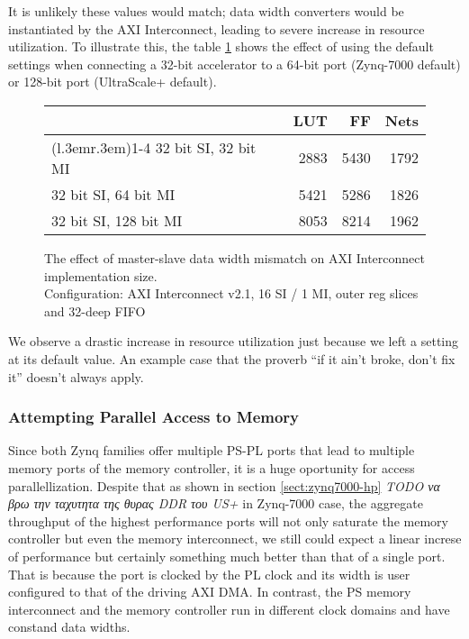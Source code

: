 It is unlikely these values would match; data width converters would be instantiated by
the AXI Interconnect, leading to severe increase in resource utilization.
To illustrate this, the table \ref{tab:int-dw} shows the effect of using the default
settings when connecting a 32-bit accelerator to a 64-bit port (Zynq-7000 default)
or 128-bit port (UltraScale+ default).

\begin{figure}[ht!]
\centering
\begin{tabular}{lrrr}
\toprule
			& LUT	& FF	& Nets \\
\cmidrule(l{.3em}r{.3em}){1-4}
32 bit SI, 32 bit MI	& 2883 & 5430 & 1792 \\
32 bit SI, 64 bit MI	& 5421	&5286	&1826	\\
32 bit SI, 128 bit MI	& 8053	&8214	&1962	\\
\bottomrule
\end{tabular}
\caption{The effect of master-slave data width mismatch on AXI Interconnect implementation size.\\
	Configuration: AXI Interconnect v2.1, 16 SI / 1 MI, outer reg slices and 32-deep FIFO}
\label{tab:int-dw}
\end{figure}

We observe a drastic increase in resource utilization just because
we left a setting at its default value. 
An example case that the proverb ``if it ain't broke, don't fix it'' doesn't always apply.

\subsubsection{Attempting Parallel Access to Memory}

Since both Zynq families offer multiple PS-PL ports that lead to 
multiple memory ports of the memory controller,
it is a huge oportunity for access parallellization.
Despite that as shown in section \ref{sect:zynq7000-hp} 
\emph{TODO να βρω την ταχυτητα της θυρας DDR του US+} in Zynq-7000 case, 
the aggregate throughput of the highest performance ports
will not only saturate the memory controller but even
the memory interconnect, we still could expect a linear increse
of performance but certainly something much better than that of a single port.
That is because the port is clocked by the PL clock and its width is
user configured to that of the driving AXI DMA. In contrast,
the PS memory interconnect and the memory controller run in different clock domains
and have constand data widths.

